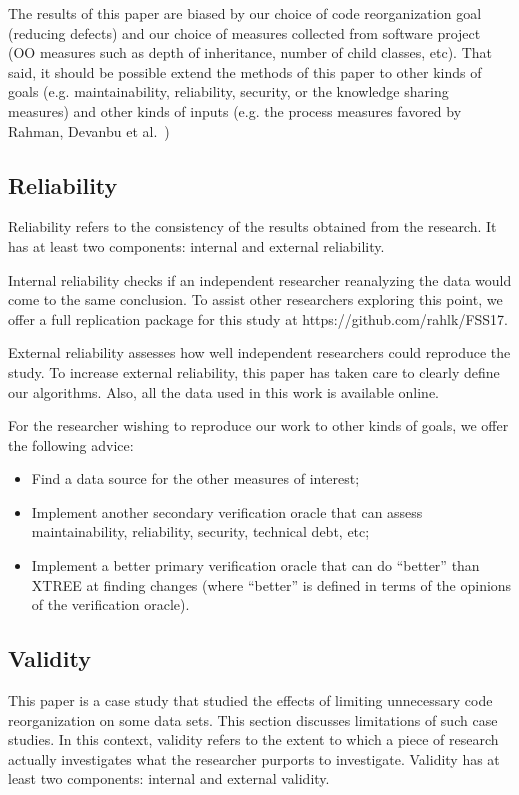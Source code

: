 \documentclass[sigconf, proceedings, 9pt]{acmart}
\begin{document}
The results of this paper are biased by our choice of code reorganization
goal (reducing defects) and our choice of measures collected from software
project (OO measures such as depth of inheritance, number of child classes,
etc). That said, it should be possible extend the methods of this paper to 
other
kinds of goals (e.g. maintainability, reliability, security, or the 
knowledge sharing
measures) and other kinds of
inputs (e.g. the process measures favored by Rahman,
Devanbu et al.~\cite{Rahman2013})

\subsection{Reliability}
Reliability refers to the consistency of the results obtained
from the research. It has at least two components: internal
and external reliability.

Internal reliability checks if an independent researcher
reanalyzing the data would come to the same conclusion.
To assist other researchers exploring this point, we offer a full 
replication package for this study at
https://github.com/rahlk/FSS17.

External reliability assesses how well independent researchers
could reproduce the study. To increase external
reliability, this paper has taken care to clearly define our
algorithms. Also, all the data used in this work is available
online.

For the researcher wishing to reproduce our work to other kinds of goals, 
we offer the following advice:

\begin{itemize}
\item Find a data source for the other measures of interest;
\item Implement another secondary verification oracle that can assess 
maintainability, reliability, security, technical debt, etc;
\item Implement a better primary verification oracle that can do ``better'' 
than XTREE at finding changes (where ``better'' is defined in terms
of the opinions of the verification oracle). 
\end{itemize}


\subsection{Validity}

This paper is a case study that studied the effects of  limiting 
unnecessary code reorganization on some data sets. This section discusses 
limitations of such case studies. In this context, validity refers to the 
extent to which a piece of research actually
investigates what the researcher purports to investigate.
Validity has at least two components: internal and
external validity.
\end{document}
